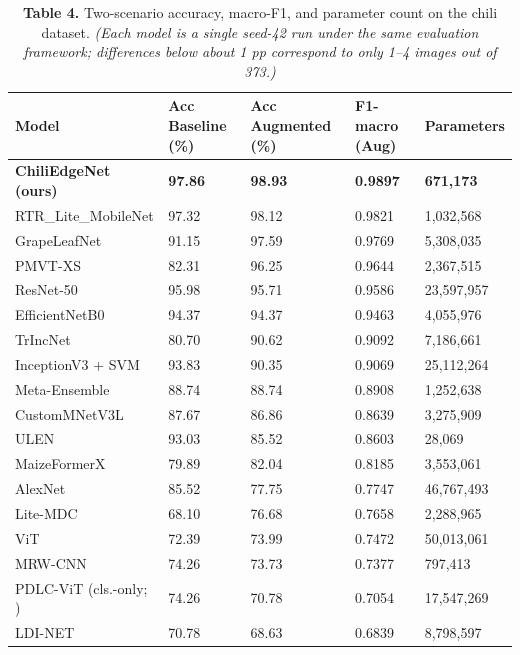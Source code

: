 \begin{table}[!tb]
\centering
\caption*{\textbf{Table 4.} Two-scenario accuracy, macro-F1, and parameter count on the chili dataset. \emph{(Each model is a single seed-42 run under the same evaluation framework; differences below about 1 pp correspond to only 1--4 images out of 373.)}}
\label{tab:4}
\footnotesize
\setlength{\tabcolsep}{2.5pt}
\renewcommand{\arraystretch}{1.15}
\begin{tabular}{lllll}
\toprule
\textbf{Model} & \textbf{Acc Baseline (\%)} & \textbf{Acc Augmented (\%)} & \textbf{F1-macro (Aug)} & \textbf{Parameters} \\
\midrule
\textbf{ChiliEdgeNet (ours)} & \textbf{97.86} & \textbf{98.93} & \textbf{0.9897} & \textbf{671,173} \\
RTR\_Lite\_MobileNet \cite{duhan2025} & 97.32 & 98.12 & 0.9821 & 1,032,568 \\
GrapeLeafNet \cite{karthik2024} & 91.15 & 97.59 & 0.9769 & 5,308,035 \\
PMVT-XS \cite{li2023} & 82.31 & 96.25 & 0.9644 & 2,367,515 \\
ResNet-50 \cite{mishra2026} & 95.98 & 95.71 & 0.9586 & 23,597,957 \\
EfficientNetB0 \cite{mishra2026} & 94.37 & 94.37 & 0.9463 & 4,055,976 \\
TrIncNet \cite{gole2023} & 80.70 & 90.62 & 0.9092 & 7,186,661 \\
InceptionV3 + SVM \cite{sujatha2025} & 93.83 & 90.35 & 0.9069 & 25,112,264 \\
Meta-Ensemble \cite{maurya2024} & 88.74 & 88.74 & 0.8908 & 1,252,638 \\
CustomMNetV3L \cite{rahaman2026} & 87.67 & 86.86 & 0.8639 & 3,275,909 \\
ULEN \cite{wang2023} & 93.03 & 85.52 & 0.8603 & 28,069 \\
MaizeFormerX \cite{rahman2026} & 79.89 & 82.04 & 0.8185 & 3,553,061 \\
AlexNet \cite{mishra2026} & 85.52 & 77.75 & 0.7747 & 46,767,493 \\
Lite-MDC \cite{bhagat2024} & 68.10 & 76.68 & 0.7658 & 2,288,965 \\
ViT \cite{ali2025} & 72.39 & 73.99 & 0.7472 & 50,013,061 \\
MRW-CNN \cite{joseph2024} & 74.26 & 73.73 & 0.7377 & 797,413 \\
PDLC-ViT (cls.-only; \cite{hemalatha2024}) & 74.26 & 70.78 & 0.7054 & 17,547,269 \\
LDI-NET \cite{yangB2024} & 70.78 & 68.63 & 0.6839 & 8,798,597 \\
\bottomrule
\end{tabular}
\end{table}

